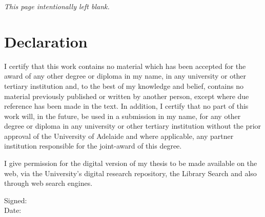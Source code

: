 \documentclass[twoside,12pt,a4paper]{report}
\makeatletter
\newcommand*{\intentionallyblankpage}{
  \vspace*{\fill}
  {\centering \textit{This page intentionally left blank.} \par}
  \vspace{\fill}}
\renewcommand*{\cleardoublepage}{\clearpage\if@twoside \ifodd\c@page\else
  \intentionallyblankpage
  \newpage
  \if@twocolumn\hbox{}\newpage\fi\fi\fi}
\makeatother
\begin{document}



% 



\cleardoublepage
\chapter*{Declaration}

I certify that this work contains no material which has been accepted 
for the award of any other degree or diploma in my name, in any
university or other tertiary institution and, to the best of my knowledge 
and belief, contains no material previously published or written
by another person, except where due reference has been made in the 
text. In addition, I certify that no part of this work will, in the
future, be used in a submission in my name, for any other degree or 
diploma in any university or other tertiary institution without the
prior approval of the University of Adelaide and where applicable, any 
partner institution responsible for the joint-award of this degree.

I give permission for the digital version of my thesis to be made 
available on the web, via the University's digital research repository,
the Library Search and also through web search engines.

\vspace{2cm}

\begin{flushleft}
Signed:  \\[15 pt]
Date:
\end{flushleft}


\end{document}
